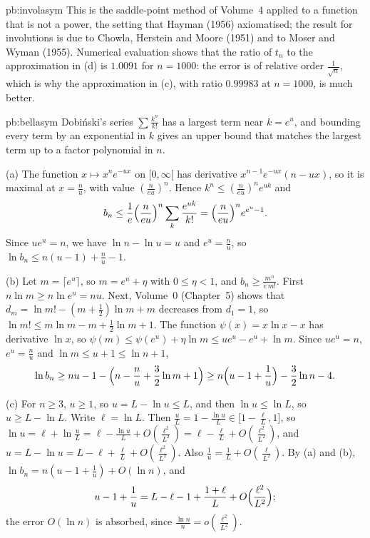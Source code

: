 \begin{solution}{pb:involasym}
\leads This is the saddle-point method of Volume~4 applied to a function that is not a power, the setting that Hayman (1956) axiomatised; the result for
involutions is due to Chowla, Herstein and Moore (1951) and to Moser and Wyman (1955). Numerical evaluation shows that the ratio of $t_n$ to the approximation
in (d) is $1.0091$ for $n=1000$: the error is of relative order $\frac1{\sqrt n}$, which is why the approximation in (c), with ratio $0.99983$ at $n=1000$, is much better.
\end{solution}

\begin{solution}{pb:bellasym}
\idea Dobi\'nski's series $\sum\frac{k^n}{k!}$ has a largest term near $k=e^u$, and bounding every term by an exponential in $k$ gives an upper bound that matches the
largest term up to a factor polynomial in $n$.

\writeup (a) The function $x\mapsto x^ne^{-ux}$ on $[0,\infty[$ has derivative $x^{n-1}e^{-ux}(n-ux)$, so it is maximal at $x=\frac nu$, with value $(\frac n{eu})^n$. Hence
$k^n\le(\frac n{eu})^ne^{uk}$ and
\[
b_n\le\frac1e\Bigl(\frac n{eu}\Bigr)^n\sum_k\frac{e^{uk}}{k!}=\Bigl(\frac n{eu}\Bigr)^ne^{e^u-1}.
\]
Since $ue^u=n$, we have $\ln n-\ln u=u$ and $e^u=\frac nu$, so $\ln b_n\le n(u-1)+\frac nu-1$.

(b) Let $m=\lceil e^u\rceil$, so $m=e^u+\eta$ with $0\le\eta<1$, and $b_n\ge\frac{m^n}{e\,m!}$. First $n\ln m\ge n\ln e^u=nu$. Next, Volume~0 (Chapter~5) shows that
$d_m=\ln m!-(m+\frac12)\ln m+m$ decreases from $d_1=1$, so $\ln m!\le m\ln m-m+\frac12\ln m+1$. The function $\psi(x)=x\ln x-x$ has derivative $\ln x$, so
$\psi(m)\le\psi(e^u)+\eta\ln m\le ue^u-e^u+\ln m$. Since $ue^u=n$, $e^u=\frac nu$ and $\ln m\le u+1\le\ln n+1$,
\[
\ln b_n\ge nu-1-\Bigl(n-\frac nu+\frac32\ln m+1\Bigr)\ge n\Bigl(u-1+\frac1u\Bigr)-\frac32\ln n-4.
\]

(c) For $n\ge3$, $u\ge1$, so $u=L-\ln u\le L$, and then $\ln u\le\ln L$, so $u\ge L-\ln L$. Write $\ell=\ln L$. Then $\frac uL=1-\frac{\ln u}L\in\bigl[1-\frac\ell L,1\bigr]$, so
$\ln u=\ell+\ln\frac uL=\ell-\frac{\ln u}L+O(\frac{\ell^2}{L^2})=\ell-\frac\ell L+O(\frac{\ell^2}{L^2})$, and $u=L-\ln u=L-\ell+\frac\ell L+O(\frac{\ell^2}{L^2})$. Also $\frac1u=\frac1L+O(\frac\ell{L^2})$. By (a) and (b),
$\ln b_n=n(u-1+\frac1u)+O(\ln n)$, and
\[
u-1+\frac1u=L-\ell-1+\frac{1+\ell}L+O\Bigl(\frac{\ell^2}{L^2}\Bigr);
\]
the error $O(\ln n)$ is absorbed, since $\frac{\ln n}n=o(\frac{\ell^2}{L^2})$.


\end{solution}
